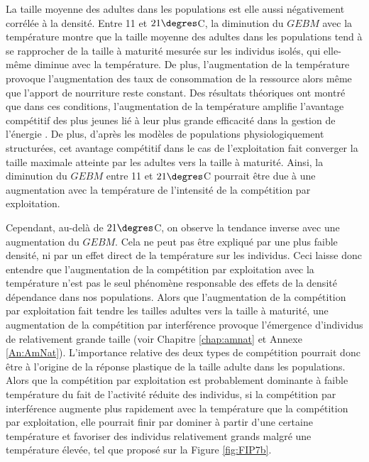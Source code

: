 La taille moyenne des adultes dans les populations est elle aussi négativement
corrélée à la densité. Entre 11 et $21\degres$C, la diminution du $GEBM$ avec la
température montre que la taille moyenne des adultes dans les populations tend à
se rapprocher de la taille à maturité mesurée sur les individus isolés, qui
elle-même diminue avec la température.
De plus, l'augmentation de la température provoque l'augmentation des taux de
consommation de la ressource alors même que l'apport de nourriture reste
constant. Des résultats théoriques ont montré que dans ces conditions,
l'augmentation de la température amplifie l'avantage compétitif des plus jeunes
lié à leur plus grande efficacité dans la gestion de l'énergie
\autocites{ohlberger2011a}.
De plus, d'après les modèles de populations physiologiquement structurées, cet
avantage compétitif dans le cas de l'exploitation fait converger la taille
maximale atteinte par les adultes vers la taille à maturité. Ainsi, la
diminution du $GEBM$ entre 11 et $21\degres$C pourrait être due à une
augmentation avec la température de l'intensité de la compétition par
exploitation. 

Cependant, au-delà de $21\degres$C, on observe la tendance inverse avec une
augmentation du $GEBM$. Cela ne peut pas être expliqué par une plus faible
densité, ni par un effet direct de la température sur les individus.
Ceci laisse donc entendre que l'augmentation de la compétition par exploitation
avec la température n'est pas le seul phénomène responsable des effets de la densité
dépendance dans nos populations. Alors que l'augmentation de la compétition par
exploitation fait tendre les tailles adultes vers la taille à maturité,
une augmentation de la compétition par interférence provoque l'émergence
d'individus de relativement grande taille (voir Chapitre \ref{chap:amnat} et
Annexe \ref{An:AmNat}).
L'importance relative des deux types de compétition pourrait donc être à l'origine de la
réponse plastique de la taille adulte dans les populations. Alors que la
compétition par exploitation est probablement dominante à faible température du
fait de l'activité réduite des individus, si la compétition par interférence
augmente plus rapidement avec la température que la compétition par
exploitation, elle pourrait finir par dominer à partir d'une certaine
température et favoriser des individus relativement grands malgré une
température élevée, tel que proposé sur la Figure \ref{fig:FIP7b}.

